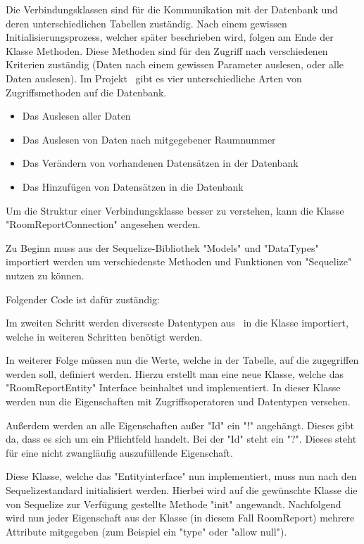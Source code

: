 
Die Verbindungsklassen sind für die Kommunikation mit der Datenbank und deren unterschiedlichen Tabellen zuständig. Nach einem gewissen Initialisierungsprozess, welcher später beschrieben wird, folgen am Ende der Klasse Methoden. Diese Methoden sind für den Zugriff nach verschiedenen Kriterien zuständig (Daten nach einem gewissen Parameter auslesen, oder alle Daten auslesen). Im Projekt \ZELIA\ gibt es vier unterschiedliche Arten von Zugriffsmethoden auf die Datenbank.

\begin{itemize}
    \item Das Auslesen aller Daten
    \item Das Auslesen von Daten nach mitgegebener Raumnummer
    \item Das Verändern von vorhandenen Datensätzen in der Datenbank
    \item Das Hinzufügen von Datensätzen in die Datenbank
\end{itemize}

Um die Struktur einer Verbindungsklasse besser zu verstehen, kann die Klasse "RoomReportConnection" angesehen werden.

Zu Beginn muss aus der Sequelize-Bibliothek "Models" und "DataTypes" importiert werden um verschiedenste Methoden und Funktionen von "Sequelize" nutzen zu können. 

Folgender Code ist dafür zuständig:


Im zweiten Schritt werden diverseste Datentypen aus \ZELIA\ in die Klasse importiert, welche in weiteren Schritten benötigt werden.

In weiterer Folge müssen nun die Werte, welche in der Tabelle, auf die zugegriffen werden soll, definiert werden. Hierzu erstellt man eine neue Klasse, welche das "RoomReportEntity" Interface beinhaltet und implementiert. In dieser Klasse werden nun die Eigenschaften mit Zugriffsoperatoren und Datentypen versehen. 

Außerdem werden an alle Eigenschaften außer "Id" ein "!" angehängt. Dieses gibt da, dass es sich um ein Pflichtfeld handelt. Bei der "Id" steht ein "?". Dieses steht für eine nicht zwangläufig auszufüllende Eigenschaft.


Diese Klasse, welche das "Entityinterface" nun implementiert, muss nun nach den Sequelizestandard initialisiert werden. Hierbei wird auf die gewünschte Klasse die von Sequelize zur Verfügung gestellte Methode "init" angewandt. Nachfolgend wird nun jeder Eigenschaft aus der Klasse (in diesem Fall RoomReport) mehrere Attribute mitgegeben (zum Beispiel ein "type" oder "allow null").

